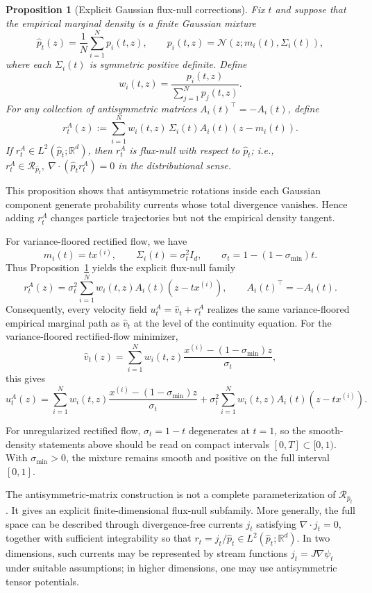 \documentclass[a4paper,11pt]{article}
\theoremstyle{plain}
\newtheorem{propositioninner}[theoreminner]{Proposition}
\theoremstyle{definition}
\newenvironment{proposition}[1][]
  {\begin{mdframed}[style=propositionstyle]\begin{propositioninner}[#1]}
  {\end{propositioninner}\end{mdframed}}
\begin{document}
\begin{proposition}[Explicit Gaussian flux-null corrections]
\label{prop:gaussian_flux_null}
Fix \(t\) and suppose that the empirical marginal density is a finite Gaussian
mixture
\[
    \hat p_t(z)
    =
    \frac1N\sum_{i=1}^N p_i(t,z),
    \qquad
    p_i(t,z)=\mathcal N(z;m_i(t),\Sigma_i(t)),
\]
where each \(\Sigma_i(t)\) is symmetric positive definite. Define
\[
    w_i(t,z)
    =
    \frac{p_i(t,z)}{\sum_{j=1}^N p_j(t,z)}.
\]
For any collection of antisymmetric matrices \(A_i(t)^\top=-A_i(t)\), define
\[
    r_t^A(z)
    :=
    \sum_{i=1}^N
    w_i(t,z)\,\Sigma_i(t)A_i(t)(z-m_i(t)).
\]
If \(r_t^A\in L^2(\hat p_t;\mathbb R^d)\), then \(r_t^A\) is flux-null with
respect to \(\hat p_t\); i.e.,
\(
    r_t^A\in\mathcal R_{\hat p_t},
    \ 
    \nabla\cdot(\hat p_t r_t^A)=0
\)
in the distributional sense.
\end{proposition}

This proposition shows that antisymmetric rotations inside each Gaussian
component generate probability currents whose total divergence vanishes. Hence
adding \(r_t^A\) changes particle trajectories but not the empirical density
tangent.

For variance-floored rectified flow, we have
\[
    m_i(t)=t x^{(i)},
    \qquad
    \Sigma_i(t)=\sigma_t^2 I_d,
    \qquad
    \sigma_t=1-(1-\sigma_{\min})t.
\]
Thus Proposition~\ref{prop:gaussian_flux_null} yields the explicit flux-null
family
\[
    r_t^A(z)
    =
    \sigma_t^2
    \sum_{i=1}^N
    w_i(t,z)A_i(t)(z-tx^{(i)}),
    \qquad
    A_i(t)^\top=-A_i(t).
\]
Consequently, every velocity field \(u_t^A=\hat v_t+r_t^A\) realizes the same
variance-floored empirical marginal path as \(\hat v_t\) at the level of the
continuity equation. For the variance-floored rectified-flow minimizer,
\[
    \hat v_t(z)
    =
    \sum_{i=1}^N
    w_i(t,z)
    \frac{x^{(i)}-(1-\sigma_{\min})z}{\sigma_t},
\]
this gives
\[
    u_t^A(z)
    =
    \sum_{i=1}^N
    w_i(t,z)
    \frac{x^{(i)}-(1-\sigma_{\min})z}{\sigma_t}
    +
    \sigma_t^2
    \sum_{i=1}^N
    w_i(t,z)A_i(t)(z-tx^{(i)}).
\]

For unregularized rectified flow, \(\sigma_t=1-t\) degenerates at \(t=1\), so
the smooth-density statements above should be read on compact intervals
\([0,T]\subset[0,1)\). With \(\sigma_{\min}>0\), the mixture remains smooth and
positive on the full interval \([0,1]\).

The antisymmetric-matrix construction is not a complete parameterization of
\(\mathcal R_{\hat p_t}\). It gives an explicit finite-dimensional flux-null
subfamily. More generally, the full space can be described through
divergence-free currents \(j_t\) satisfying \(\nabla\cdot j_t=0\), together
with sufficient integrability so that \(r_t=j_t/\hat p_t\in
L^2(\hat p_t;\mathbb R^d)\). In two dimensions, such currents may be represented
by stream functions \(j_t=J\nabla\psi_t\) under suitable 
assumptions; in higher dimensions, one may use antisymmetric tensor potentials.
\end{document}
